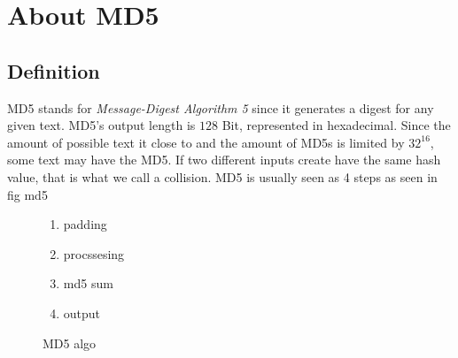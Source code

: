 \chapter{About MD5}
\label{chapter:kap2}
\section{Definition}
MD5 stands for \textit{Message-Digest Algorithm 5} since it generates a digest for any given text. MD5's output length is $128$ Bit, represented in hexadecimal. Since the amount of possible text it close to
and the amount of MD5s is limited by $32^{16}$, some text may have the MD5. If two different inputs create have the same hash value, that is what we call a collision.
MD5 is usually seen as 4 steps as seen in fig {md5}\\
\begin{figure}
    \begin{enumerate}
        \item padding
        \item procssesing
        \item md5 sum 
        \item output
    \end{enumerate}
\caption{MD5 algo}
\label{md5}
\end{figure}
